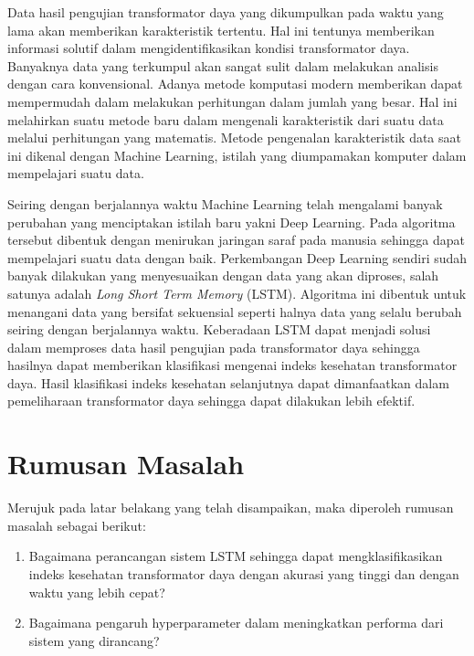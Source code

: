 Data hasil pengujian transformator daya yang dikumpulkan pada waktu yang lama akan memberikan karakteristik tertentu. Hal ini tentunya memberikan informasi solutif dalam mengidentifikasikan kondisi transformator daya. Banyaknya data yang terkumpul akan sangat sulit dalam melakukan analisis dengan cara konvensional. Adanya metode komputasi modern memberikan dapat mempermudah dalam melakukan perhitungan dalam jumlah yang besar. Hal ini melahirkan suatu metode baru dalam mengenali karakteristik dari suatu data melalui perhitungan yang matematis. Metode pengenalan karakteristik data saat ini dikenal dengan Machine Learning, istilah yang diumpamakan komputer dalam mempelajari suatu data.\par
 Seiring dengan berjalannya waktu Machine Learning telah mengalami banyak perubahan yang menciptakan istilah baru yakni Deep Learning. Pada algoritma tersebut dibentuk dengan menirukan jaringan saraf pada manusia sehingga dapat mempelajari suatu data dengan baik. Perkembangan Deep Learning sendiri sudah banyak dilakukan yang menyesuaikan dengan data yang akan diproses, salah satunya adalah \textit{Long Short Term Memory} (LSTM). Algoritma ini dibentuk untuk menangani data yang bersifat sekuensial seperti halnya data yang selalu berubah seiring dengan berjalannya waktu. Keberadaan LSTM dapat menjadi solusi dalam memproses data hasil pengujian pada transformator daya sehingga hasilnya dapat memberikan klasifikasi mengenai indeks kesehatan transformator daya. Hasil klasifikasi indeks kesehatan selanjutnya dapat dimanfaatkan dalam pemeliharaan transformator daya sehingga dapat dilakukan lebih efektif.


\section{Rumusan Masalah}
Merujuk pada latar belakang yang telah disampaikan, maka diperoleh rumusan masalah sebagai berikut:
\begin{enumerate}
	\item Bagaimana perancangan sistem LSTM sehingga dapat mengklasifikasikan indeks kesehatan transformator daya dengan akurasi yang tinggi dan dengan waktu yang lebih cepat?
	\item Bagaimana pengaruh hyperparameter dalam meningkatkan performa dari sistem yang dirancang?
\end{enumerate}


